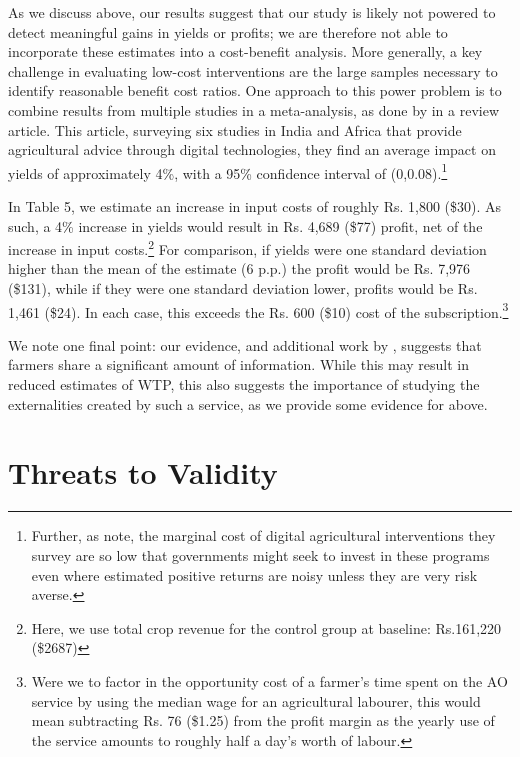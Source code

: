\documentclass[12pt]{article}
\begin{document}
As we discuss above, our results suggest that our study is likely not powered to detect meaningful gains in yields or profits; we are therefore not able to incorporate these estimates into a cost-benefit analysis. More generally, a key challenge in evaluating low-cost interventions are the large samples necessary to identify reasonable benefit cost ratios. One approach to this power problem is to combine results from multiple studies in a meta-analysis, as done by \citet{fabregas2019realizing} in a review article.  This article, surveying six studies in India and Africa that provide agricultural advice through digital technologies, they find an average impact on yields of approximately 4\%, with a 95\% confidence interval of (0,0.08).\footnote{Further, as \citet{fabregas2019realizing} note, the marginal cost of digital agricultural interventions they survey are so low that governments might seek to invest in these programs even where estimated positive returns are noisy unless they are very risk averse.}

In Table 5, we estimate an increase in input costs of roughly Rs. 1,800 (\$30). As such, a 4\% increase in yields would result in Rs. 4,689 (\$77) profit, net of the increase in input costs.\footnote{Here, we use total crop revenue for the control group at baseline: Rs.161,220 (\$2687)} For comparison, if yields were one standard deviation higher than the mean of the \citet{fabregas2019realizing} estimate (6 p.p.) the profit would be Rs. 7,976 (\$131), while if they were one standard deviation lower, profits would be Rs. 1,461 (\$24). In each case, this exceeds the Rs. 600 (\$10) cost of the subscription.\footnote{Were we to factor in the opportunity cost of a farmer's time spent on the AO service by using the median wage for an agricultural labourer, this would mean subtracting Rs. 76 (\$1.25) from the profit margin as the yearly use of the service amounts to roughly half a day's worth of labour.}

We note one final point: our evidence, and additional work by \citet{Fernando2016sotech}, suggests that farmers share a significant amount of information. While this may result in reduced estimates of WTP, this also suggests the importance of studying the externalities created by such a service, as we provide some evidence for above. 

\section{\protect\normalsize Threats to Validity}
\end{document}
